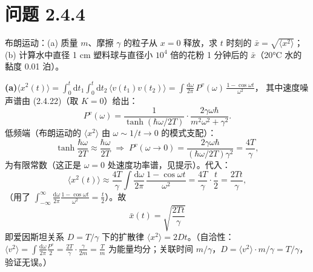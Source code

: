 \section*{问题 2.4.4}
\begin{problem}
布朗运动：(a) 质量 $m$、摩擦 $\gamma$ 的粒子从 $x=0$ 释放，求 $t$ 时刻的 $\bar x=\sqrt{\langle x^2\rangle}$；(b) 计算水中直径 1 cm 塑料球与直径小 $10^4$ 倍的花粉 1 分钟后的 $\bar x$（20°C 水的黏度 0.01 泊）。
\end{problem}
\solution
\textbf{(a)}$\langle x^2(t)\rangle=\int_0^t\mathrm{d}t_1\int_0^t\mathrm{d}t_2\,\langle v(t_1)v(t_2)\rangle
=\int\frac{\mathrm{d}\omega}{2\pi}\,P^v(\omega)\,\frac{1-\cos\omega t}{\omega^2}$，
其中速度噪声谱由 (2.4.22)（取 $K=0$）给出：
\begin{equation*}
P^v(\omega)=\frac{1}{\tanh(\hbar\omega/2T)}\cdot\frac{2\gamma\omega\hbar}{m^2\omega^2+\gamma^2}.
\end{equation*}
低频端（布朗运动的 $\langle x^2\rangle$ 由 $\omega\sim1/t\to0$ 的模式支配）：
\begin{equation*}
\tanh\frac{\hbar\omega}{2T}\approx\frac{\hbar\omega}{2T}
\;\Longrightarrow\;
P^v(\omega\to0)=\frac{2\gamma\omega\hbar}{(\hbar\omega/2T)\gamma^2}=\frac{4T}{\gamma},
\end{equation*}
为有限常数（这正是 $\omega=0$ 处速度功率谱，见提示）。代入：
\begin{equation*}
\langle x^2(t)\rangle\approx\frac{4T}{\gamma}\int\frac{\mathrm{d}\omega}{2\pi}\,\frac{1-\cos\omega t}{\omega^2}
=\frac{4T}{\gamma}\cdot\frac t2
=\frac{2Tt}{\gamma},
\end{equation*}
（用了 $\int_{-\infty}^{\infty}\frac{\mathrm{d}\omega}{2\pi}\frac{1-\cos\omega t}{\omega^2}=\frac t2$）。故
\begin{equation*}
\boxed{\;\bar x(t)=\sqrt{\frac{2Tt}{\gamma}}\;}
\end{equation*}
即爱因斯坦关系 $D=T/\gamma$ 下的扩散律 $\langle x^2\rangle=2Dt$。（自洽性：$\langle v^2\rangle=\int\frac{\mathrm{d}\omega}{2\pi}\frac{P^v}{2}=\frac{2T}{\gamma}\cdot\frac{\gamma}{2m}=\frac Tm$ 为能量均分；关联时间 $m/\gamma$，$D=\langle v^2\rangle\cdot m/\gamma=T/\gamma$，验证无误。）

